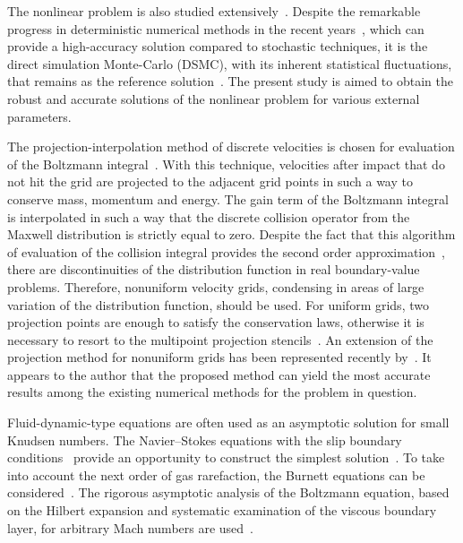\documentclass[]{jfm}
\begin{document}
The nonlinear problem is also studied extensively~\citep{Garzo2003}.
Despite the remarkable progress in deterministic numerical methods
in the recent years~\citep[see e.g.][]{Dimarco2014,Mieussens2014},
which can provide a high-accuracy solution compared to stochastic techniques,
it is the direct simulation Monte-Carlo (DSMC), with its inherent statistical fluctuations,
that remains as the reference solution~\citep{Cercignani1994}.
The present study is aimed to obtain the robust and accurate solutions
of the nonlinear problem for various external parameters.

The projection-interpolation method of discrete velocities is chosen for
evaluation of the Boltzmann integral~\citep{Tcheremissine1998, Tcheremissine2006}.
With this technique, velocities after impact that do not hit the grid
are projected to the adjacent grid points in such a way to conserve mass, momentum and energy.
The gain term of the Boltzmann integral is interpolated in such a way that
the discrete collision operator from the Maxwell distribution is strictly equal to zero.
Despite the fact that this algorithm of evaluation of the collision integral
provides the second order approximation~\citep{Anikin2012},
there are discontinuities of the distribution function in real boundary-value problems.
Therefore, nonuniform velocity grids, condensing in areas of large variation
of the distribution function, should be used.
For uniform grids, two projection points are enough to satisfy the conservation laws,
otherwise it is necessary to resort to the multipoint projection stencils~\citep{Dodulad2012}.
An extension of the projection method for nonuniform grids has been represented recently by~\citet{Dodulad2015}.
It appears to the author that the proposed method can yield the most accurate results
among the existing numerical methods for the problem in question.

Fluid-dynamic-type equations are often used as an asymptotic solution for small Knudsen numbers.
The Navier--Stokes equations with the slip boundary conditions~\citep{Ohwada1989a}
provide an opportunity to construct the simplest solution~\citep{Sharipov2000}.
To take into account the next order of gas rarefaction, the Burnett equations can be considered~\citep{Reese2003}.
The rigorous asymptotic analysis of the Boltzmann equation,
based on the Hilbert expansion and systematic examination of the viscous boundary layer,
for arbitrary Mach numbers are used~\citep{Sone2000}.
\end{document}
